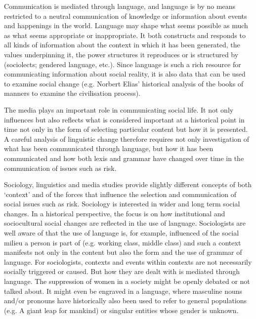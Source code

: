 Communication is mediated through language, and language is by no means restricted to a neutral communication of knowledge or information about events and happenings in the world. Language may shape what seems possible as much as what seems appropriate or inappropriate. It both constructs and responds to all kinds of information about the context in which it has been generated, the values underpinning it, the power structures it reproduces or is structured by (sociolects; gendered language, etc.). Since language is such a rich resource for communicating information about social reality, it is also data that can be used to examine social change (e.g. Norbert Elias' historical analysis of the books of manners to examine the civilisation process).

The media plays an important role in communicating social life. It not only influences but also reflects what is considered important at a historical point in time not only in the form of selecting particular content but how it is presented. A careful analysis of linguistic change therefore requires not only investigation of what has been communicated through language, but how it has been communicated and how both lexis and grammar have changed over time in the communication of issues such as risk.

Sociology, linguistics and media studies provide slightly different concepts of both `context' and of the forces that influence the selection and communication of social issues such as risk. Sociology is interested in wider and long term social changes. In a historical perspective, the focus is on how institutional and sociocultural social changes are reflected in the use of language. Sociologists are well aware of that the use of language is, for example, influenced of the social milieu a person is part of (e.g. working class, middle class) and such a context manifests not only in the content but also the form and the use of grammar of language. For sociologists, contexts and events within contexts are not necessarily socially triggered or caused. But how they are dealt with is mediated through language. The suppression of women in a society might be openly debated or not talked about. It might even be engraved in a language, where masculine nouns and/or pronouns have historically also been used to refer to general populations (e.g. A giant leap for mankind) or singular entities whose gender is unknown.

